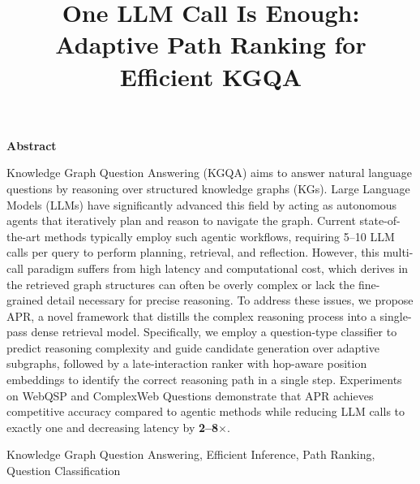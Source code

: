 \documentclass[conference]{IEEEtran}
\title{One LLM Call Is Enough: Adaptive Path Ranking for Efficient KGQA}
\author{\IEEEauthorblockN{Anonymous Authors}}
\newcommand{\model}{\textsc{APR}}
\begin{document}
\maketitle

\begin{center}
    \textbf{Abstract}
\end{center}
Knowledge Graph Question Answering (KGQA) aims to answer natural language questions by reasoning over structured knowledge graphs (KGs). Large Language Models (LLMs) have significantly advanced this field by acting as autonomous agents that iteratively plan and reason to navigate the graph. Current state-of-the-art methods typically employ such agentic workflows, requiring 5--10 LLM calls per query to perform planning, retrieval, and reflection. However, this multi-call paradigm suffers from high latency and computational cost, which derives in the retrieved graph structures can often be overly complex or lack the fine-grained detail necessary for precise reasoning. To address these issues, we propose \model{}, a novel framework that distills the complex reasoning process into a single-pass dense retrieval model.
Specifically, we employ a question-type classifier to predict reasoning complexity and guide candidate generation over adaptive subgraphs, followed by a late-interaction ranker with hop-aware position embeddings to identify the correct reasoning path in a single step. Experiments on WebQSP and ComplexWeb Questions demonstrate that \model{} achieves competitive accuracy compared to agentic methods while reducing LLM calls to exactly one and decreasing latency by \textbf{2--8$\times$}.

\begin{IEEEkeywords}
Knowledge Graph Question Answering, Efficient Inference, Path Ranking, Question Classification
\end{IEEEkeywords}

\end{document}
